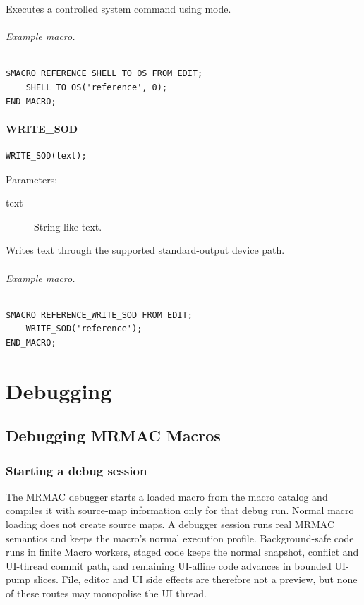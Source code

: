 \documentclass[a4paper,10pt,twoside,openany]{book}
\newenvironment{mrmacextension}{\begin{changebar}}{\end{changebar}}
\begin{document}
Executes a controlled system command using mode.

\paragraph{Example macro.}
\begin{verbatim}
$MACRO REFERENCE_SHELL_TO_OS FROM EDIT;
    SHELL_TO_OS('reference', 0);
END_MACRO;
\end{verbatim}

\label{prim:procedure-write-sod}
\subsection*{WRITE\_SOD}
\begin{verbatim}
WRITE_SOD(text);
\end{verbatim}
Parameters:
\begin{description}
\item[text] String-like text.
\end{description}

Writes text through the supported standard-output device path.

\paragraph{Example macro.}
\begin{verbatim}
$MACRO REFERENCE_WRITE_SOD FROM EDIT;
    WRITE_SOD('reference');
END_MACRO;
\end{verbatim}


\part{Debugging}

\chapter{Debugging MRMAC Macros}

\begin{mrmacextension}
\section{Starting a debug session}

The MRMAC debugger starts a loaded macro from the macro catalog and compiles it
with source-map information only for that debug run. Normal macro loading does
not create source maps. A debugger session runs real MRMAC semantics and keeps
the macro's normal execution profile. Background-safe code runs in finite
Macro workers, staged code keeps the normal snapshot, conflict and UI-thread
commit path, and remaining UI-affine code advances in bounded UI-pump slices.
File, editor and UI side effects are therefore not a preview, but none of
these routes may monopolise the UI thread.
\end{mrmacextension}
\end{document}
